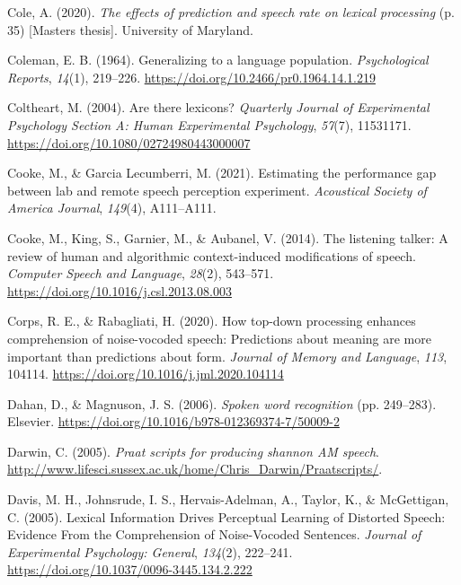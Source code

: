 \documentclass[a4paper, nobind]{templates/ociamthesis}
\newlength{\cslhangindent}
\newenvironment{CSLReferences}[2] %
 {%
  \setlength{\parindent}{0pt}
  \ifodd #1
  \let\oldpar\par
  \def\par{\hangindent=\cslhangindent\oldpar}
  \fi
  \setlength{\parskip}{1mm}
  \setlength{\baselineskip}{6mm}
 }%
 {}
\begin{document}
\begin{CSLReferences}{1}{0}
\leavevmode{}%
Cole, A. (2020). \emph{{The effects of prediction and speech rate on lexical processing}} (p. 35) {[}Masters thesis{]}. University of Maryland.

\leavevmode{}%
Coleman, E. B. (1964). {Generalizing to a language population}. \emph{Psychological Reports}, \emph{14}(1), 219--226. \url{https://doi.org/10.2466/pr0.1964.14.1.219}

\leavevmode{}%
Coltheart, M. (2004). Are there lexicons? \emph{Quarterly Journal of Experimental Psychology Section A: Human Experimental Psychology}, \emph{57}(7), 11531171. \url{https://doi.org/10.1080/02724980443000007}

\leavevmode{}%
Cooke, M., \& Garcia Lecumberri, M. (2021). Estimating the performance gap between lab and remote speech perception experiment. \emph{Acoustical Society of America Journal}, \emph{149}(4), A111--A111.

\leavevmode{}%
Cooke, M., King, S., Garnier, M., \& Aubanel, V. (2014). {The listening talker: A review of human and algorithmic context-induced modifications of speech}. \emph{Computer Speech and Language}, \emph{28}(2), 543--571. \url{https://doi.org/10.1016/j.csl.2013.08.003}

\leavevmode{}%
Corps, R. E., \& Rabagliati, H. (2020). How top-down processing enhances comprehension of noise-vocoded speech: Predictions about meaning are more important than predictions about form. \emph{Journal of Memory and Language}, \emph{113}, 104114. \url{https://doi.org/10.1016/j.jml.2020.104114}

\leavevmode{}%
Dahan, D., \& Magnuson, J. S. (2006). \emph{Spoken word recognition} (pp. 249--283). Elsevier. \url{https://doi.org/10.1016/b978-012369374-7/50009-2}

\leavevmode{}%
Darwin, C. (2005). \emph{Praat scripts for producing shannon AM speech}. \url{http://www.lifesci.sussex.ac.uk/home/Chris_Darwin/Praatscripts/}.

\leavevmode{}%
Davis, M. H., Johnsrude, I. S., Hervais-Adelman, A., Taylor, K., \& McGettigan, C. (2005). Lexical Information Drives Perceptual Learning of Distorted Speech: Evidence From the Comprehension of Noise-Vocoded Sentences. \emph{Journal of Experimental Psychology: General}, \emph{134}(2), 222--241. \url{https://doi.org/10.1037/0096-3445.134.2.222}


\end{CSLReferences}
\end{document}
